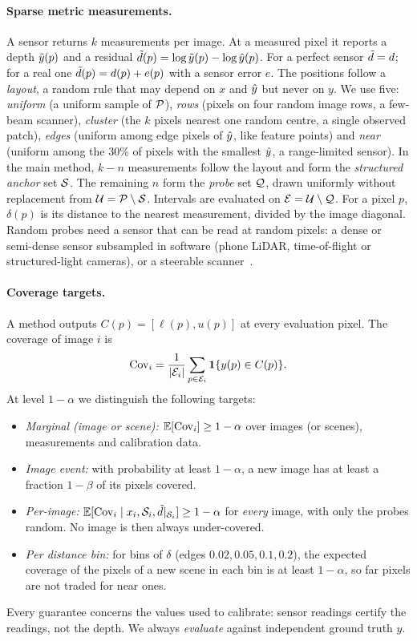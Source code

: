 \paragraph{Sparse metric measurements.}
A sensor returns $k$ measurements per image.
At a measured pixel it reports a depth $\tilde{y}(p)$ and a residual $\tilde{d}(p)=\log\tilde{y}(p)-\log\hat{y}(p)$.
For a perfect sensor $\tilde{d}=d$; for a real one $\tilde{d}(p)=d(p)+e(p)$ with a sensor error $e$.
The positions follow a \emph{layout}, a random rule that may depend on $x$ and $\hat{y}$ but never on $y$.
We use five: \emph{uniform} (a uniform sample of $\mathcal{P}$), \emph{rows} (pixels on four random image rows, a few-beam scanner), \emph{cluster} (the $k$ pixels nearest one random centre, a single observed patch), \emph{edges} (uniform among edge pixels of $\hat{y}$, like feature points) and \emph{near} (uniform among the 30\% of pixels with the smallest $\hat{y}$, a range-limited sensor).
In the main method, $k-n$ measurements follow the layout and form the \emph{structured anchor} set $\mathcal{S}$.
The remaining $n$ form the \emph{probe} set $\mathcal{Q}$, drawn uniformly without replacement from $\mathcal{U}=\mathcal{P}\setminus\mathcal{S}$.
Intervals are evaluated on $\mathcal{E}=\mathcal{U}\setminus\mathcal{Q}$.
For a pixel $p$, $\delta(p)$ is its distance to the nearest measurement, divided by the image diagonal.
Random probes need a sensor that can be read at random pixels: a dense or semi-dense sensor subsampled in software (phone LiDAR, time-of-flight or structured-light cameras), or a steerable scanner~\cite{pittaluga2020mems,bergman2020adaptivelidar}.

\paragraph{Coverage targets.}
A method outputs $C(p)=[\ell(p),u(p)]$ at every evaluation pixel.
The coverage of image $i$ is
\begin{equation}
\mathrm{Cov}_i=\frac{1}{|\mathcal{E}_i|}\sum_{p\in\mathcal{E}_i}\mathbf{1}\{y(p)\in C(p)\}.
\label{eq:cov}
\end{equation}
At level $1-\alpha$ we distinguish the following targets:
\begin{itemize}[leftmargin=*,itemsep=1pt,topsep=2pt]
\item \emph{Marginal (image or scene):} $\mathbb{E}[\mathrm{Cov}_i]\ge1-\alpha$ over images (or scenes), measurements and calibration data.
\item \emph{Image event:} with probability at least $1-\alpha$, a new image has at least a fraction $1-\beta$ of its pixels covered.
\item \emph{Per-image:} $\mathbb{E}[\mathrm{Cov}_i\mid x_i,\mathcal{S}_i,\tilde{d}|_{\mathcal{S}_i}]\ge1-\alpha$ for \emph{every} image, with only the probes random.
No image is then always under-covered.
\item \emph{Per distance bin:} for bins of $\delta$ (edges $0.02,0.05,0.1,0.2$), the expected coverage of the pixels of a new scene in each bin is at least $1-\alpha$, so far pixels are not traded for near ones.
\end{itemize}
Every guarantee concerns the values used to calibrate: sensor readings certify the readings, not the depth.
We always \emph{evaluate} against independent ground truth $y$.

